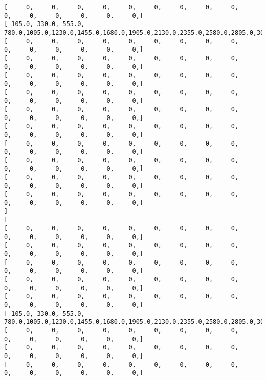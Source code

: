 \documentclass[11pt]{article}
\begin{document}
\begin{Verbatim}[commandchars=\\\{\}]
[      0,      0,      0,      0,      0,      0,      0,      0,      0,      0,      0,      0,      0,      0,      0, ]
[  105.0,  330.0,  555.0,  780.0, 1005.0, 1230.0, 1455.0, 1680.0, 1905.0, 2130.0, 2355.0, 2580.0, 2805.0, 3030.0, 3255.0, ]
[      0,      0,      0,      0,      0,      0,      0,      0,      0,      0,      0,      0,      0,      0,      0, ]
[      0,      0,      0,      0,      0,      0,      0,      0,      0,      0,      0,      0,      0,      0,      0, ]
[      0,      0,      0,      0,      0,      0,      0,      0,      0,      0,      0,      0,      0,      0,      0, ]
[      0,      0,      0,      0,      0,      0,      0,      0,      0,      0,      0,      0,      0,      0,      0, ]
[      0,      0,      0,      0,      0,      0,      0,      0,      0,      0,      0,      0,      0,      0,      0, ]
[      0,      0,      0,      0,      0,      0,      0,      0,      0,      0,      0,      0,      0,      0,      0, ]
[      0,      0,      0,      0,      0,      0,      0,      0,      0,      0,      0,      0,      0,      0,      0, ]
[      0,      0,      0,      0,      0,      0,      0,      0,      0,      0,      0,      0,      0,      0,      0, ]
[      0,      0,      0,      0,      0,      0,      0,      0,      0,      0,      0,      0,      0,      0,      0, ]
[      0,      0,      0,      0,      0,      0,      0,      0,      0,      0,      0,      0,      0,      0,      0, ]
]
[
[      0,      0,      0,      0,      0,      0,      0,      0,      0,      0,      0,      0,      0,      0,      0, ]
[      0,      0,      0,      0,      0,      0,      0,      0,      0,      0,      0,      0,      0,      0,      0, ]
[      0,      0,      0,      0,      0,      0,      0,      0,      0,      0,      0,      0,      0,      0,      0, ]
[      0,      0,      0,      0,      0,      0,      0,      0,      0,      0,      0,      0,      0,      0,      0, ]
[      0,      0,      0,      0,      0,      0,      0,      0,      0,      0,      0,      0,      0,      0,      0, ]
[  105.0,  330.0,  555.0,  780.0, 1005.0, 1230.0, 1455.0, 1680.0, 1905.0, 2130.0, 2355.0, 2580.0, 2805.0, 3030.0, 3255.0, ]
[      0,      0,      0,      0,      0,      0,      0,      0,      0,      0,      0,      0,      0,      0,      0, ]
[      0,      0,      0,      0,      0,      0,      0,      0,      0,      0,      0,      0,      0,      0,      0, ]
[      0,      0,      0,      0,      0,      0,      0,      0,      0,      0,      0,      0,      0,      0,      0, ]

\end{Verbatim}
\end{document}
